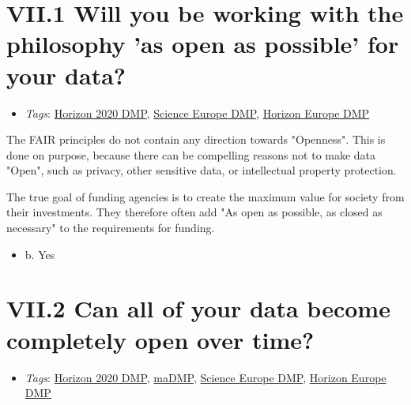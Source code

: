 \documentclass[a4paper,12pt]{report}
\begin{document}
\section*{\protect\textcolor{colorSecId}{VII.1} Will you be working with the philosophy 'as open as possible' for your data?}

\label{6be88f7c-f868-460f-bba7-91e1c659adfd.6516eae1-98b2-48f2-9862-b5fb140cfad7}


\begin{itemize}
  \item \textit{Tags}: \ul{Horizon 2020 DMP}, \ul{Science Europe DMP}, \ul{Horizon Europe DMP}
  \end{itemize}


\noindent
\begin{markdown}
The FAIR principles do not contain any direction towards "Openness". This is done on purpose, because there can be compelling reasons not to make data "Open", such as privacy, other sensitive data, or intellectual property protection.

The true goal of funding agencies is to create the maximum value for society from their investments. They therefore often add "As open as possible, as closed as necessary" to the requirements for funding.
\end{markdown}



\begin{itemize}
  \item[\CheckmarkBold] b. Yes
\end{itemize}






\section*{\protect\textcolor{colorSecId}{VII.2} Can all of your data become completely open over time?}

\label{6be88f7c-f868-460f-bba7-91e1c659adfd.a549d10b-aa46-4c0c-863f-30219ac5ecce}


\begin{itemize}
  \item \textit{Tags}: \ul{Horizon 2020 DMP}, \ul{maDMP}, \ul{Science Europe DMP}, \ul{Horizon Europe DMP}
  \end{itemize}
\end{document}
